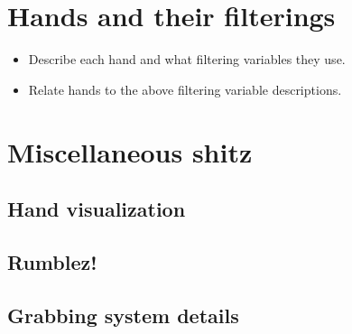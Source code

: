 
\section{Hands and their filterings}
\label{sec:LABELABOUTHANDSVERSIONS}
\begin{itemize}
\item Describe each hand and what filtering variables they use.
\item Relate hands to the above filtering variable descriptions.
\end{itemize}

\section{Miscellaneous shitz}
\label{sec:MISCELLANEOUSSHITZ}

\subsection{Hand visualization}
\label{subsec:handVisualization}

\subsection{Rumblez!}
\label{subsec:RUMLBEZ}

\subsection{Grabbing system details}
\label{subsec:grabbingSystem}